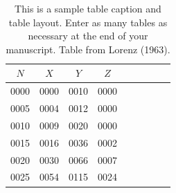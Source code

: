 \documentclass[12pt]{article}
\begin{document}
\begin{table}[t]
\caption{This is a sample table caption and table layout.  Enter as many tables as
  necessary at the end of your manuscript. Table from Lorenz (1963).}\label{t1}
\begin{center}
\begin{tabular}{ccccrrcrc}
\hline\hline
$N$ & $X$ & $Y$ & $Z$\\
\hline
 0000 & 0000 & 0010 & 0000 \\
 0005 & 0004 & 0012 & 0000 \\
 0010 & 0009 & 0020 & 0000 \\
 0015 & 0016 & 0036 & 0002 \\
 0020 & 0030 & 0066 & 0007 \\
 0025 & 0054 & 0115 & 0024 \\
\hline
\end{tabular}
\end{center}
\end{table}
%
\end{document}
